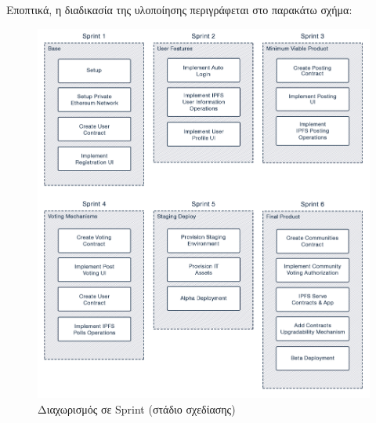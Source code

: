 \newpage
Εποπτικά, η διαδικασία της υλοποίησης περιγράφεται στο παρακάτω σχήμα:

\vspace{\baselineskip}

\begin{figure}[H]
    \centering
    \includegraphics[width=\textwidth]{assets/figures/chapter-3/3.8.implementation-methodology-specification-sprints}
    \caption{Διαχωρισμός σε Sprint (στάδιο σχεδίασης)}
    \label{figure:3.8.implementation-methodology-specification-sprints}
\end{figure}
